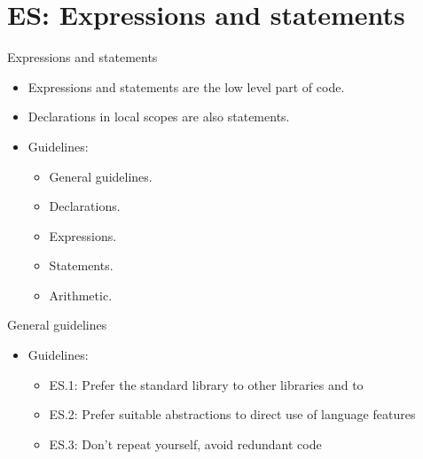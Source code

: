 \section{ES: Expressions and statements}

\begin{frame}[t]{Expressions and statements}
\begin{itemize}
  \item Expressions and statements are the low level part of code.
  \item Declarations in local scopes are also statements.

  \item Guidelines:
    \begin{itemize}
      \item General guidelines.
      \item Declarations.
      \item Expressions.
      \item Statements.
      \item Arithmetic.
    \end{itemize}
\end{itemize}
\end{frame}

\begin{frame}[t]{General guidelines}
\begin{itemize}
  \item Guidelines:
    \begin{itemize}
      \item ES.1: Prefer the standard library to other libraries and 
            to 
      \item ES.2: Prefer suitable abstractions to direct use of language features
      \item ES.3: Don’t repeat yourself, avoid redundant code
    \end{itemize}
\end{itemize}
\end{frame}

